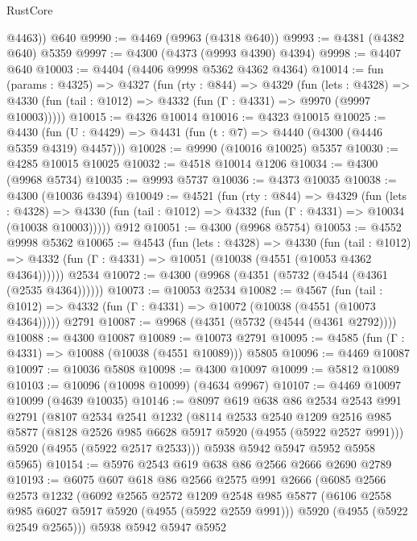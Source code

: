 \begin{lexlean}{RustCore}
\begin{coremodule}
        @4463))
    @640
@9990 := @4469 (@9963 (@4318 @640))
@9993 := @4381 (@4382 @640) @5359
@9997 := @4300 (@4373 (@9993 @4390) @4394)
@9998 := @4407 @640
@10003 := @4404 (@4406 @9998 @5362 @4362 @4364)
@10014 := fun (params : @4325) =>
  @4327
    (fun (rty : @844) =>
    @4329
      (fun (lets : @4328) =>
      @4330 (fun (tail : @1012) => @4332 (fun (Γ : @4331) => @9970 (@9997 @10003)))))
@10015 := @4326 @10014
@10016 := @4323 @10015
@10025 := @4430 (fun (U : @4429) => @4431 (fun (t : @7) => @4440 (@4300 (@4446 @5359 @4319) @4457)))
@10028 := @9990 (@10016 @10025) @5357
@10030 := @4285 @10015 @10025
@10032 := @4518 @10014 @1206
@10034 := @4300 (@9968 @5734)
@10035 := @9993 @5737
@10036 := @4373 @10035
@10038 := @4300 (@10036 @4394)
@10049 := @4521
    (fun (rty : @844) =>
    @4329
      (fun (lets : @4328) =>
      @4330 (fun (tail : @1012) => @4332 (fun (Γ : @4331) => @10034 (@10038 @10003)))))
    @912
@10051 := @4300 (@9968 @5754)
@10053 := @4552 @9998 @5362
@10065 := @4543
    (fun (lets : @4328) =>
    @4330
      (fun (tail : @1012) =>
      @4332 (fun (Γ : @4331) => @10051 (@10038 (@4551 (@10053 @4362 @4364))))))
    @2534
@10072 := @4300 (@9968 (@4351 (@5732 (@4544 (@4361 (@2535 @4364))))))
@10073 := @10053 @2534
@10082 := @4567
    (fun (tail : @1012) => @4332 (fun (Γ : @4331) => @10072 (@10038 (@4551 (@10073 @4364)))))
    @2791
@10087 := @9968 (@4351 (@5732 (@4544 (@4361 @2792))))
@10088 := @4300 @10087
@10089 := @10073 @2791
@10095 := @4585 (fun (Γ : @4331) => @10088 (@10038 (@4551 @10089))) @5805
@10096 := @4469 @10087
@10097 := @10036 @5808
@10098 := @4300 @10097
@10099 := @5812 @10089
@10103 := @10096 (@10098 @10099) (@4634 @9967)
@10107 := @4469 @10097 @10099 (@4639 @10035)
@10146 := @8097
    @619
    @638
    @86
    @2534
    @2543
    @991
    @2791
    (@8107
      @2534
      @2541
      @1232
      (@8114
        @2533
        @2540
        @1209
        @2516
        @985
        @5877
        (@8128 @2526 @985 @6628 @5917 @5920 (@4955 (@5922 @2527 @991)))
        @5920
        (@4955 (@5922 @2517 @2533)))
      @5938
      @5942
      @5947
      @5952
      @5958
      @5965)
@10154 := @5976 @2543 @619 @638 @86 @2566 @2666 @2690 @2789
@10193 := @6075
    @607
    @618
    @86
    @2566
    @2575
    @991
    @2666
    (@6085
      @2566
      @2573
      @1232
      (@6092
        @2565
        @2572
        @1209
        @2548
        @985
        @5877
        (@6106 @2558 @985 @6027 @5917 @5920 (@4955 (@5922 @2559 @991)))
        @5920
        (@4955 (@5922 @2549 @2565)))
      @5938
      @5942
      @5947
      @5952

\end{coremodule}
\end{lexlean}
